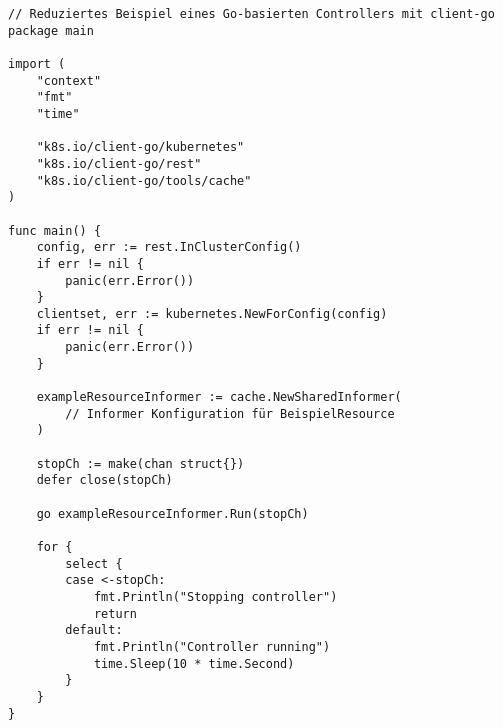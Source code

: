 \begin{verbatim}
// Reduziertes Beispiel eines Go-basierten Controllers mit client-go
package main

import (
    "context"
    "fmt"
    "time"

    "k8s.io/client-go/kubernetes"
    "k8s.io/client-go/rest"
    "k8s.io/client-go/tools/cache"
)

func main() {
    config, err := rest.InClusterConfig()
    if err != nil {
        panic(err.Error())
    }
    clientset, err := kubernetes.NewForConfig(config)
    if err != nil {
        panic(err.Error())
    }

    exampleResourceInformer := cache.NewSharedInformer(
        // Informer Konfiguration für BeispielResource
    )

    stopCh := make(chan struct{})
    defer close(stopCh)

    go exampleResourceInformer.Run(stopCh)

    for {
        select {
        case <-stopCh:
            fmt.Println("Stopping controller")
            return
        default:
            fmt.Println("Controller running")
            time.Sleep(10 * time.Second)
        }
    }
}
\end{verbatim}